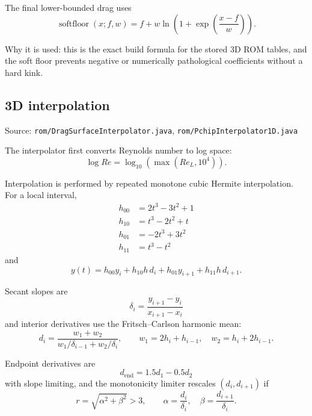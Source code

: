 \documentclass[11pt]{article}
\begin{document}
The final lower-bounded drag uses
\begin{equation*}
\operatorname{softfloor}(x;f,w) = f + w\ln\!\left(1+\exp\!\left(\frac{x-f}{w}\right)\right).
\end{equation*}

Why it is used: this is the exact build formula for the stored 3D ROM tables, and the soft floor prevents negative or numerically pathological coefficients without a hard kink.

\subsection{3D interpolation}
Source: \texttt{rom/DragSurfaceInterpolator.java}, \texttt{rom/PchipInterpolator1D.java}

The interpolator first converts Reynolds number to log space:
\begin{equation*}
\log Re = \log_{10}(\max(Re_L,10^4)).
\end{equation*}

Interpolation is performed by repeated monotone cubic Hermite interpolation. For a local interval,
\begin{align*}
h_{00} &= 2t^3 - 3t^2 + 1 \\
h_{10} &= t^3 - 2t^2 + t \\
h_{01} &= -2t^3 + 3t^2 \\
h_{11} &= t^3 - t^2
\end{align*}
and
\begin{equation*}
y(t)=h_{00}y_i + h_{10}h\,d_i + h_{01}y_{i+1} + h_{11}h\,d_{i+1}.
\end{equation*}

Secant slopes are
\begin{equation*}
\delta_i = \frac{y_{i+1}-y_i}{x_{i+1}-x_i}
\end{equation*}
and interior derivatives use the Fritsch--Carlson harmonic mean:
\begin{equation*}
d_i = \frac{w_1+w_2}{w_1/\delta_{i-1} + w_2/\delta_i},
\qquad
w_1 = 2h_i + h_{i-1},\quad
w_2 = h_i + 2h_{i-1}.
\end{equation*}

Endpoint derivatives are
\begin{equation*}
d_{\mathrm{end}} = 1.5d_1 - 0.5d_2
\end{equation*}
with slope limiting, and the monotonicity limiter rescales $(d_i,d_{i+1})$ if
\begin{equation*}
r = \sqrt{\alpha^2+\beta^2} > 3,\qquad
\alpha = \frac{d_i}{\delta_i},\quad \beta = \frac{d_{i+1}}{\delta_i}.
\end{equation*}
\end{document}

